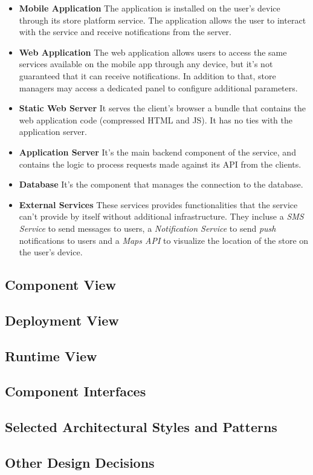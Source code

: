 \begin{itemize}
    \item \textbf{Mobile Application} The application is installed on the user's device through its store platform service. The application allows the user to interact with the service and receive notifications from the server.
    \item \textbf{Web Application} The web application allows users to access the same services available on the mobile app through any device, but it's not guaranteed that it can receive notifications. In addition to that, store managers may access a dedicated panel to configure additional parameters.
    \item \textbf{Static Web Server} It serves the client's browser a bundle that contains the web application code (compressed HTML and JS). It has no ties with the application server.
    \item \textbf{Application Server} It's the main backend component of the service, and contains the logic to process requests made against its API from the clients.
    \item \textbf{Database} It's the component that manages the connection to the database.
    \item \textbf{External Services} These services provides functionalities that the service can't provide by itself without additional infrastructure. They incluse a \emph{SMS Service} to send messages to users, a \emph{Notification Service} to send \emph{push} notifications to users and a \emph{Maps API} to visualize the location of the store on the user's device.
\end{itemize}

\subsection{Component View}

\subsection{Deployment View}

\subsection{Runtime View}

\subsection{Component Interfaces}

\subsection{Selected Architectural Styles and Patterns}

\subsection{Other Design Decisions}
